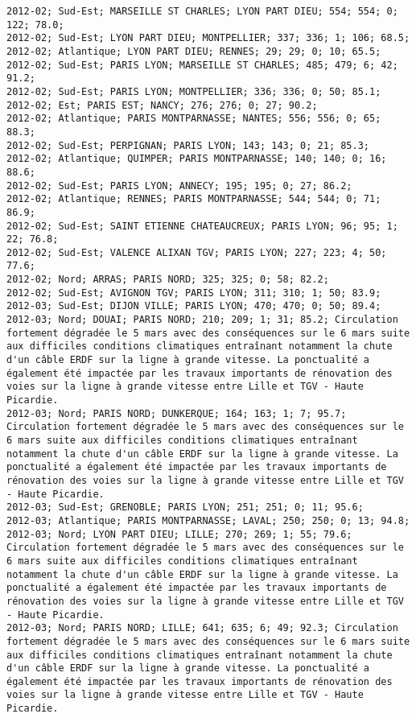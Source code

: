 \documentclass{article}
\begin{document}
\begin{Verbatim}[commandchars=\\\{\}]
2012-02; Sud-Est; MARSEILLE ST CHARLES; LYON PART DIEU; 554; 554; 0; 122; 78.0; 
2012-02; Sud-Est; LYON PART DIEU; MONTPELLIER; 337; 336; 1; 106; 68.5; 
2012-02; Atlantique; LYON PART DIEU; RENNES; 29; 29; 0; 10; 65.5; 
2012-02; Sud-Est; PARIS LYON; MARSEILLE ST CHARLES; 485; 479; 6; 42; 91.2; 
2012-02; Sud-Est; PARIS LYON; MONTPELLIER; 336; 336; 0; 50; 85.1; 
2012-02; Est; PARIS EST; NANCY; 276; 276; 0; 27; 90.2; 
2012-02; Atlantique; PARIS MONTPARNASSE; NANTES; 556; 556; 0; 65; 88.3; 
2012-02; Sud-Est; PERPIGNAN; PARIS LYON; 143; 143; 0; 21; 85.3; 
2012-02; Atlantique; QUIMPER; PARIS MONTPARNASSE; 140; 140; 0; 16; 88.6; 
2012-02; Sud-Est; PARIS LYON; ANNECY; 195; 195; 0; 27; 86.2; 
2012-02; Atlantique; RENNES; PARIS MONTPARNASSE; 544; 544; 0; 71; 86.9; 
2012-02; Sud-Est; SAINT ETIENNE CHATEAUCREUX; PARIS LYON; 96; 95; 1; 22; 76.8; 
2012-02; Sud-Est; VALENCE ALIXAN TGV; PARIS LYON; 227; 223; 4; 50; 77.6; 
2012-02; Nord; ARRAS; PARIS NORD; 325; 325; 0; 58; 82.2; 
2012-02; Sud-Est; AVIGNON TGV; PARIS LYON; 311; 310; 1; 50; 83.9; 
2012-03; Sud-Est; DIJON VILLE; PARIS LYON; 470; 470; 0; 50; 89.4; 
2012-03; Nord; DOUAI; PARIS NORD; 210; 209; 1; 31; 85.2; Circulation fortement dégradée le 5 mars avec des conséquences sur le 6 mars suite aux difficiles conditions climatiques entraînant notamment la chute d'un câble ERDF sur la ligne à grande vitesse. La ponctualité a également été impactée par les travaux importants de rénovation des voies sur la ligne à grande vitesse entre Lille et TGV - Haute Picardie.
2012-03; Nord; PARIS NORD; DUNKERQUE; 164; 163; 1; 7; 95.7; Circulation fortement dégradée le 5 mars avec des conséquences sur le 6 mars suite aux difficiles conditions climatiques entraînant notamment la chute d'un câble ERDF sur la ligne à grande vitesse. La ponctualité a également été impactée par les travaux importants de rénovation des voies sur la ligne à grande vitesse entre Lille et TGV - Haute Picardie.
2012-03; Sud-Est; GRENOBLE; PARIS LYON; 251; 251; 0; 11; 95.6; 
2012-03; Atlantique; PARIS MONTPARNASSE; LAVAL; 250; 250; 0; 13; 94.8; 
2012-03; Nord; LYON PART DIEU; LILLE; 270; 269; 1; 55; 79.6; Circulation fortement dégradée le 5 mars avec des conséquences sur le 6 mars suite aux difficiles conditions climatiques entraînant notamment la chute d'un câble ERDF sur la ligne à grande vitesse. La ponctualité a également été impactée par les travaux importants de rénovation des voies sur la ligne à grande vitesse entre Lille et TGV - Haute Picardie.
2012-03; Nord; PARIS NORD; LILLE; 641; 635; 6; 49; 92.3; Circulation fortement dégradée le 5 mars avec des conséquences sur le 6 mars suite aux difficiles conditions climatiques entraînant notamment la chute d'un câble ERDF sur la ligne à grande vitesse. La ponctualité a également été impactée par les travaux importants de rénovation des voies sur la ligne à grande vitesse entre Lille et TGV - Haute Picardie.

\end{Verbatim}
\end{document}
